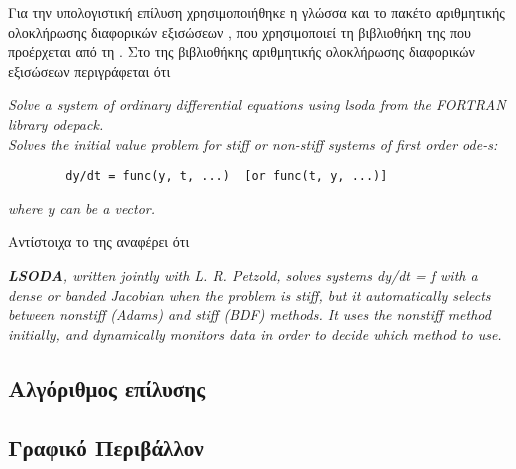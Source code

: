 Για την υπολογιστική επίλυση χρησιμοποιήθηκε η γλώσσα \textit{} και το πακέτο αριθμητικής ολοκλήρωσης διαφορικών εξισώσεων \textit{}, που χρησιμοποιεί τη βιβλιοθήκη της \textit{} που προέρχεται από τη \textit{}. Στο  της βιβλιοθήκης αριθμητικής ολοκλήρωσης διαφορικών εξισώσεων \textit{} περιγράφεται ότι
\begin{displayquote}
    \textit{Solve a system of ordinary differential equations using lsoda from the FORTRAN library odepack.}  \\
    \textit{Solves the initial value problem for stiff or non-stiff systems of first order ode-s:}
    \begin{verbatim}
        dy/dt = func(y, t, ...)  [or func(t, y, ...)]
    \end{verbatim}
    \textit{where y can be a vector.}
\end{displayquote}

Αντίστοιχα το  της  αναφέρει ότι
\begin{displayquote}
    \textit{\textbf{LSODA}, written jointly with L. R. Petzold, solves systems dy/dt = f with a dense or banded Jacobian when the problem is stiff, but it automatically selects between nonstiff (Adams) and stiff (BDF) methods. It uses the nonstiff method initially, and dynamically monitors data in order to decide which method to use.}
\end{displayquote}

\subsection{Αλγόριθμος επίλυσης}
\lstset{style=nonums}


\subsection{Γραφικό Περιβάλλον}